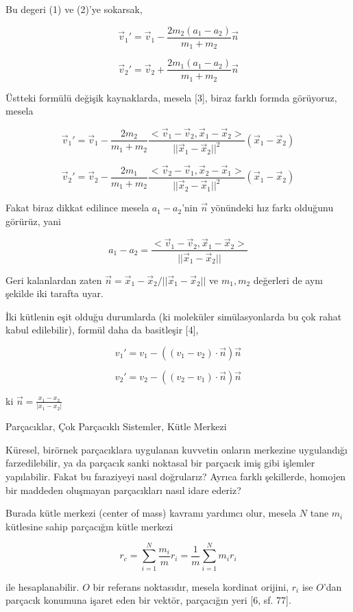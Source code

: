 \documentclass[12pt,fleqn]{article}\usepackage{../../common}
\begin{document}
Bu degeri (1) ve (2)'ye sokarsak,


$$
\vec{v}_1' = \vec{v}_1 - \frac{2 m_2 (a_1-a_2)}{m_1+m_2} \vec{n}
$$

$$
\vec{v}_2' = \vec{v}_2 + \frac{2 m_1 (a_1-a_2)}{m_1+m_2} \vec{n}
$$

Üstteki formülü değişik kaynaklarda, mesela [3], biraz farklı formda görüyoruz,
mesela

$$
\vec{v}_1' =
\vec{v}_1 - \frac{2m_2}{m_1+m_2}
\frac{< \vec{v}_1-\vec{v}_2, \vec{x}_1-\vec{x}_2 >}{||\vec{x}_1-\vec{x}_2||^2}
(\vec{x}_1-\vec{x}_2)
$$

$$
\vec{v}_2' =
\vec{v}_2 - \frac{2m_1}{m_1+m_2}
\frac{< \vec{v}_2-\vec{v}_1, \vec{x}_2-\vec{x}_1 >}{||\vec{x}_2-\vec{x}_1||^2}
(\vec{x}_1-\vec{x}_2)
$$

Fakat biraz dikkat edilince mesela $a_1-a_2$'nin $\vec{n}$ yönündeki hız farkı
olduğunu görürüz, yani

$$
a_1-a_2=\frac{< \vec{v}_1-\vec{v}_2,\vec{x}_1-\vec{x}_2 >}{||\vec{x}_1-\vec{x}_2||}
$$

Geri kalanlardan zaten $\vec{n} = \vec{x}_1-\vec{x}_2/||\vec{x}_1-\vec{x}_2||$
ve $m_1,m_2$ değerleri de aynı şekilde iki tarafta uyar.

İki kütlenin eşit olduğu durumlarda (ki moleküler simülasyonlarda bu çok rahat
kabul edilebilir), formül daha da basitleşir [4],

$$
v_1' = v_1 - \left( (v_1-v_2)  \cdot \vec{n} \right) \vec{n}
$$

$$
v_2' = v_2 - \left( (v_2-v_1)  \cdot \vec{n} \right) \vec{n}
$$

ki $\vec{n} = \frac{x_1-x_2}{|x_1-x_2|}$

Parçacıklar, Çok Parçacıklı Sistemler, Kütle Merkezi

Küresel, birörnek parçacıklara uygulanan kuvvetin onların merkezine uygulandığı
farzedilebilir, ya da parçacık sanki noktasal bir parçacık imiş gibi işlemler
yapılabilir. Fakat bu faraziyeyi nasıl doğrularız? Ayrıca farklı şekillerde,
homojen bir maddeden oluşmayan parçacıkları nasıl idare ederiz?

Burada kütle merkezi (center of mass) kavramı yardımcı olur, mesela $N$ tane
$m_i$ kütlesine sahip parçacığın kütle merkezi

$$
r_c =
\sum _{i=1}^{N} \frac{m_i}{m} r_i =
\frac{1}{m} \sum _{i=1}^{N} m_i r_i
$$

ile hesaplanabilir. $O$ bir referans noktasıdır, mesela kordinat orijini, $r_i$
ise $O$'dan parçacık konumuna işaret eden bir vektör, parçacığın yeri [6,
  sf. 77].
\end{document}
